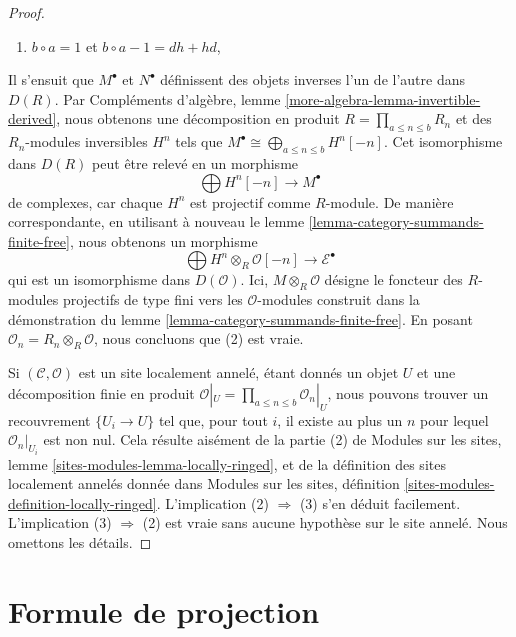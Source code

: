 \begin{proof}
\begin{enumerate}
\item $b \circ a = 1$ et $b \circ a - 1 = dh + hd$,
\end{enumerate}
Il s'ensuit que $M^\bullet$ et $N^\bullet$ définissent des objets inverses
l'un de l'autre dans $D(R)$. Par Compléments d'algèbre, lemme
\ref{more-algebra-lemma-invertible-derived}, nous obtenons une décomposition
en produit $R = \prod_{a \leq n \leq b} R_n$ et des $R_n$-modules inversibles
$H^n$ tels que
$M^\bullet \cong \bigoplus_{a \leq n \leq b} H^n[-n]$. Cet isomorphisme dans
$D(R)$ peut être relevé en un morphisme
$$
\bigoplus H^n[-n] \longrightarrow M^\bullet
$$
de complexes, car chaque $H^n$ est projectif comme $R$-module. De manière
correspondante, en utilisant à nouveau le lemme
\ref{lemma-category-summands-finite-free}, nous obtenons un morphisme
$$
\bigoplus H^n \otimes_R \mathcal{O}[-n] \to \mathcal{E}^\bullet
$$
qui est un isomorphisme dans $D(\mathcal{O})$. Ici,
$M \otimes_R \mathcal{O}$ désigne le foncteur des $R$-modules projectifs de
type fini vers les $\mathcal{O}$-modules construit dans la démonstration du
lemme \ref{lemma-category-summands-finite-free}. En posant
$\mathcal{O}_n = R_n \otimes_R \mathcal{O}$, nous concluons que (2) est vraie.

\medskip\noindent
Si $(\mathcal{C}, \mathcal{O})$ est un site localement annelé, étant donnés
un objet $U$ et une décomposition finie en produit
$\mathcal{O}|_U = \prod_{a \leq n \leq b} \mathcal{O}_n|_U$, nous pouvons
trouver un recouvrement $\{U_i \to U\}$ tel que, pour tout $i$, il existe au
plus un $n$ pour lequel $\mathcal{O}_n|_{U_i}$ est non nul. Cela résulte
aisément de la partie (2) de Modules sur les sites, lemme
\ref{sites-modules-lemma-locally-ringed}, et de la définition des sites
localement annelés donnée dans Modules sur les sites, définition
\ref{sites-modules-definition-locally-ringed}. L'implication
(2) $\Rightarrow$ (3) s'en déduit facilement. L'implication
(3) $\Rightarrow$ (2) est vraie sans aucune hypothèse sur le site annelé.
Nous omettons les détails.
\end{proof}










\section{Formule de projection}
\label{section-projection-formula}

